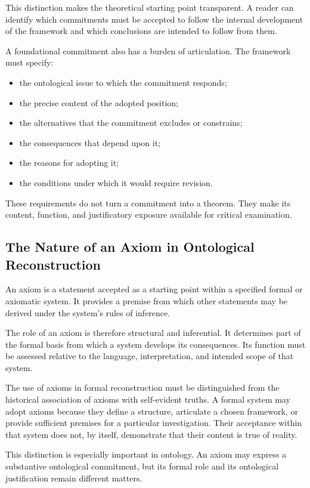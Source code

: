This distinction makes the theoretical starting point
transparent. A reader can identify which commitments must
be accepted to follow the internal development of the
framework and which conclusions are intended to follow
from them.

A foundational commitment also has a burden of articulation.
The framework must specify:

\begin{itemize}
    \item the ontological issue to which the commitment responds;
    \item the precise content of the adopted position;
    \item the alternatives that the commitment excludes or constrains;
    \item the consequences that depend upon it;
    \item the reasons for adopting it;
    \item the conditions under which it would require revision.
\end{itemize}

These requirements do not turn a commitment into a theorem.
They make its content, function, and justificatory exposure
available for critical examination.

\subsection{The Nature of an Axiom in Ontological Reconstruction}

An axiom is a statement accepted as a starting point within
a specified formal or axiomatic system. It provides a premise
from which other statements may be derived under the system's
rules of inference.

The role of an axiom is therefore structural and inferential.
It determines part of the formal basis from which a system
develops its consequences. Its function must be assessed
relative to the language, interpretation, and intended scope
of that system.

The use of axioms in formal reconstruction must be distinguished
from the historical association of axioms with self-evident
truths. A formal system may adopt axioms because they define
a structure, articulate a chosen framework, or provide
sufficient premises for a particular investigation. Their
acceptance within that system does not, by itself, demonstrate
that their content is true of reality.

This distinction is especially important in ontology. An
axiom may express a substantive ontological commitment, but
its formal role and its ontological justification remain
different matters.

